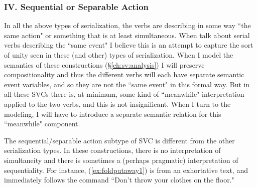 \begin{comment}
\ex~ \label{ex:talkabout}
\begingl
\glpreamble ʔuḥʔaƛiič n̓uw̓iiqskqs \textbf{ʔuumac̓kʷ} \textbf{ʔiiqḥuk} ʔumʔiiqskqs. //
\gla ʔuḥ=ʔaƛ=(y)ii=č n̓uw̓iiqsu=ʔak=qaˑs \textbf{ʔu-L.mac̓uk} \textbf{ʔiiqḥ-uk} ʔumʔiiqsu=ʔak=qaˑs //
\glb be=\textsc{now}=\textsc{weak.3}=\textsc{hrsy} father=\textsc{poss}=\textsc{defn.1sg} \textbf{talk.about} \textbf{tell-\textsc{dr}} mother=\textsc{poss}=\textsc{defn.1sg} //
\glft `It was my father who told my mother about it.' (\textbf{Q}, Sophie Billy) //
\endgl
\xe

Like the other SVCs, the transitive verb can be separated from its object.


\end{comment}

\subsubsection{IV. Sequential or Separable Action}

\vspace{10pt}

In all the above types of serialization, the verbs are describing in some way ``the same action" or something that is at least simultaneous. When \cite{aikhenvalddixon2006} talk about serial verbs describing the ``same event" I believe this is an attempt to capture the sort of unity seen in these (and other) types of serialization. When I model the semantics of these constructions (\S\ref{ch:sv:analysis}) I will preserve compositionality and thus the different verbs will each have separate semantic event variables, and so they are not the ``same event" in this formal way. But in all these SVCs there is, at minimum, some kind of ``meanwhile" interpretation applied to the two verbs, and this is not insignificant. When I turn to the modeling, I will have to introduce a separate semantic relation for this ``meanwhile" component.

The sequential/separable action subtype of SVC is different from the other serialization types. In these constructions, there is no interpretation of simultaneity and there is sometimes a (perhaps pragmatic) interpretation of sequentiality. For instance, (\ref{ex:foldputaway1}) is from an exhortative text, and immediately follows the command ``Don't throw your clothes on the floor."


